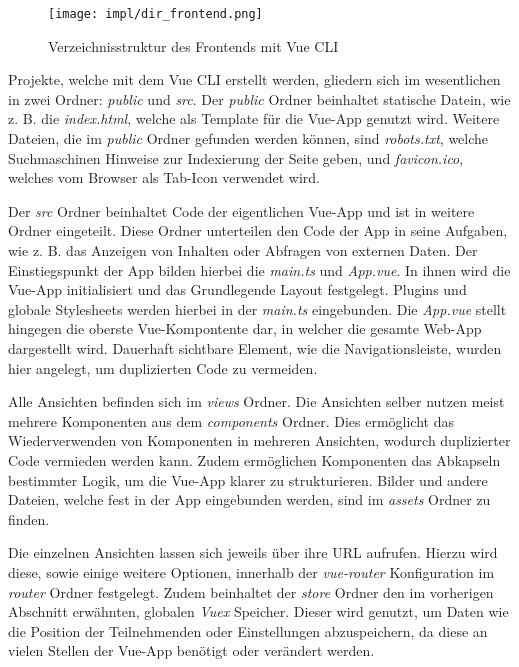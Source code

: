 \begin{figure}[htpb]
    \centering
    \texttt{[image: impl/dir\_frontend.png]}
    \caption{Verzeichnisstruktur des Frontends mit Vue CLI}
    \label{fig:impl-frontend-vuecli-dir}
\end{figure}

Projekte, welche mit dem Vue CLI erstellt werden, gliedern sich im wesentlichen
in zwei Ordner: \textit{public} und \textit{src}. Der \textit{public} Ordner
beinhaltet statische Datein, wie z. B. die \textit{index.html}, welche als
Template für die Vue-App genutzt wird. Weitere Dateien, die im \textit{public}
Ordner gefunden werden können, sind \textit{robots.txt}, welche
Suchmaschinen Hinweise zur Indexierung der Seite geben, und
\textit{favicon.ico}, welches vom Browser als Tab-Icon verwendet wird.

Der \textit{src} Ordner beinhaltet Code der eigentlichen Vue-App und ist in
weitere Ordner eingeteilt. Diese Ordner unterteilen den Code der App in seine
Aufgaben, wie z. B. das Anzeigen von Inhalten oder Abfragen von externen Daten.
Der Einstiegspunkt der App bilden hierbei die \textit{main.ts} und
\textit{App.vue}. In ihnen wird die Vue-App initialisiert und das Grundlegende
Layout festgelegt. Plugins und globale Stylesheets werden hierbei in der
\textit{main.ts} eingebunden. Die \textit{App.vue} stellt hingegen die oberste
Vue-Kompontente dar, in welcher die gesamte Web-App dargestellt wird. Dauerhaft
sichtbare Element, wie die Navigationsleiste, wurden hier angelegt, um
duplizierten Code zu vermeiden.

Alle Ansichten befinden sich im \textit{views} Ordner. Die Ansichten selber
nutzen meist mehrere Komponenten aus dem \textit{components} Ordner. Dies
ermöglicht das Wiederverwenden von Komponenten in mehreren Ansichten, wodurch
duplizierter Code vermieden werden kann. Zudem ermöglichen Komponenten das
Abkapseln bestimmter Logik, um die Vue-App klarer zu strukturieren. Bilder und
andere Dateien, welche fest in der App eingebunden werden, sind im
\textit{assets} Ordner zu finden.

Die einzelnen Ansichten lassen sich jeweils über ihre URL aufrufen. Hierzu wird
diese, sowie einige weitere Optionen, innerhalb der \textit{vue-router}
Konfiguration im \textit{router} Ordner festgelegt. Zudem beinhaltet der
\textit{store} Ordner den im vorherigen Abschnitt erwähnten, globalen
\textit{Vuex} Speicher. Dieser wird genutzt, um Daten wie die Position der
Teilnehmenden oder Einstellungen abzuspeichern, da diese an vielen Stellen der
Vue-App benötigt oder verändert werden.

